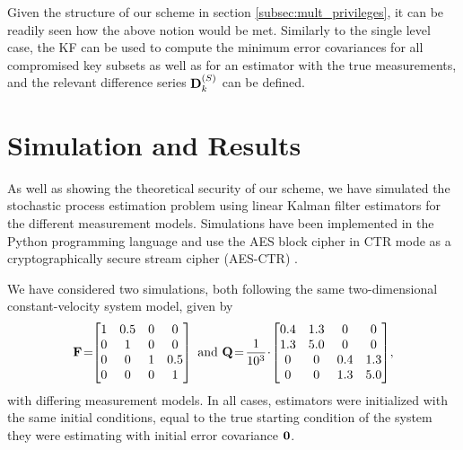 \documentclass[letterpaper, 10 pt, conference]{ieeeconf}
\begin{document}
Given the structure of our scheme in section \ref{subsec:mult_privileges}, it can be readily seen how the above notion would be met. Similarly to the single level case, the KF can be used to compute the minimum error covariances for all compromised key subsets as well as for an estimator with the true measurements, and the relevant difference series ${{\mathbf{D}}}^{(S)}_k$ can be defined. 

% 
%                                                     
% 

\addtolength{\textheight}{-0.638cm}

% 
%                                 
%                                 
%                                 
% 

\section{Simulation and Results}\label{sec:simulation}
As well as showing the theoretical security of our scheme, we have simulated the stochastic process estimation problem using linear Kalman filter estimators for the different measurement models. Simulations have been implemented in the Python programming language and use the AES block cipher in CTR mode as a cryptographically secure stream cipher (AES-CTR) \cite{gueronIntelAdvancedEncryption2010}.

We have considered two simulations, both following the same two-dimensional constant-velocity system model, given by
\begin{equation*}
   \mat{F}\! = \!\!
   \begin{bmatrix}
      1 & 0.5 & 0 & 0\\
      0 & 1 & 0 & 0\\
      0 & 0 & 1 & 0.5\\
      0 & 0 & 0 & 1
   \end{bmatrix}
\text{ and }
   \mat{Q}\! = \!\frac{1}{10^3}\!\cdot\!
   \begin{bmatrix}
      0.4 & 1.3 & 0 & 0\\
      1.3 & 5.0 & 0 & 0\\
      0 & 0 & 0.4 & 1.3\\
      0 & 0 & 1.3 & 5.0
   \end{bmatrix}\!,
\end{equation*}
with differing measurement models. In all cases, estimators were initialized with the same initial conditions, equal to the true starting condition of the system they were estimating with initial error covariance ${{\mathbf{0}}}$.
\end{document}
